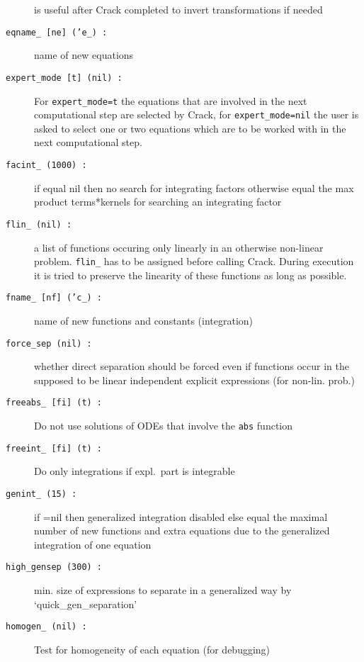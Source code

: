 \documentclass[12pt]{article}
\begin{document}
\begin{description}
                   is useful after {\sc Crack} completed to invert
                   transformations if needed
\item[{\tt eqname\_ [ne] ('e\_) :}] name of new equations
\item[{\tt expert\_mode [t] (nil) :}] For {\tt expert\_mode=t} the
                   equations that are involved in the next computational step are
                   selected by {\sc Crack}, for {\tt expert\_mode=nil} the user 
                   is asked to select one or two equations which are to be worked 
                   with in the next computational step. 
\item[{\tt facint\_ (1000) :}] if equal nil then no search for
                    integrating factors otherwise equal the  max
                    product terms*kernels for searching an integrating
                    factor
\item[{\tt flin\_ (nil) :}] a list of functions occuring only linearly in an
                   otherwise non-linear problem. {\tt flin\_} has to be assigned
                   before calling {\sc Crack}. During execution it is tried to
                   preserve the linearity of these functions as long as possible.
\item[{\tt fname\_ [nf] ('c\_) :}] name of new functions and constants
                                   (integration)
\item[{\tt force\_sep (nil) :}] whether direct separation should be forced even
                   if functions occur in the supposed to be linear
                   independent explicit expressions (for non-lin. prob.)
\item[{\tt freeabs\_ [fi] (t) :}] Do not use solutions of ODEs that
                    involve the {\tt abs} function
\item[{\tt freeint\_ [fi] (t) :}] Do only integrations if expl.\ part
                    is integrable 
\item[{\tt genint\_ (15) :}]  if =nil then generalized integration disabled
                    else equal the maximal number of new functions and extra
                    equations due to the generalized integration of
                    one equation  
\item[{\tt high\_gensep (300) :}] min. size of expressions to separate in a 
                    generalized way by \\ `quick\_gen\_separation'
\item[{\tt homogen\_ (nil) :}] Test for homogeneity of each equation 
                    (for debugging)

\end{description}
\end{document}
